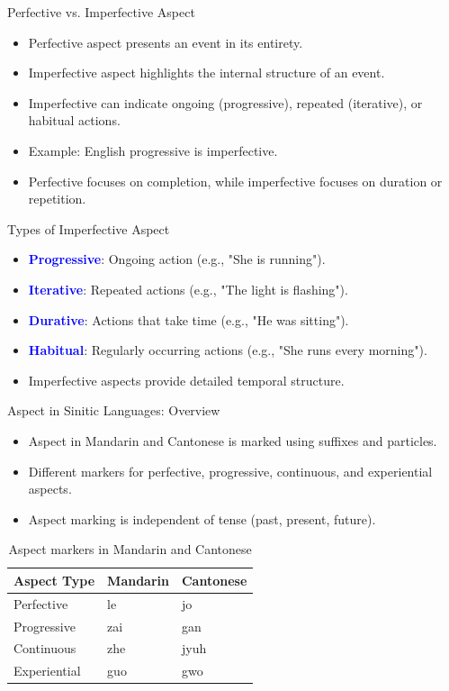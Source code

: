 \documentclass{beamer}
\newcommand{\txx}[1]{\textcolor{blue}{\textbf{#1}}}
\begin{document}
\begin{frame}{Perfective vs. Imperfective Aspect}
\begin{itemize}
    \item Perfective aspect presents an event in its entirety.
    \item Imperfective aspect highlights the internal structure of an event.
    \item Imperfective can indicate ongoing (progressive), repeated (iterative), or habitual actions.
    \item Example: English progressive  is imperfective.
    \item Perfective focuses on completion, while imperfective focuses on duration or repetition.
\end{itemize}
\end{frame}

\begin{frame}{Types of Imperfective Aspect}
\begin{itemize}
    \item \txx{Progressive}: Ongoing action (e.g., "She is running").
    \item \txx{Iterative}: Repeated actions (e.g., "The light is flashing").
    \item \txx{Durative}: Actions that take time (e.g., "He was sitting").
    \item \txx{Habitual}: Regularly occurring actions (e.g., "She runs every morning").
    \item Imperfective aspects provide detailed temporal structure.
\end{itemize}
\end{frame}

\begin{frame}{Aspect in Sinitic Languages: Overview}
\begin{itemize}
    \item Aspect in Mandarin and Cantonese is marked using suffixes and particles.
    \item Different markers for perfective, progressive, continuous, and experiential aspects.
    \item Aspect marking is independent of tense (past, present, future).
    \end{itemize}
    \begin{table}
\begin{tabular}{lll}
\hline
\textbf{Aspect Type} & \textbf{Mandarin} & \textbf{Cantonese} \\
\hline
Perfective & le & jo \\
Progressive & zai & gan \\
Continuous & zhe & jyuh \\
Experiential & guo & gwo \\
\hline
\end{tabular}
\caption{Aspect markers in Mandarin and Cantonese}
\end{table}
\end{frame}
\end{document}
